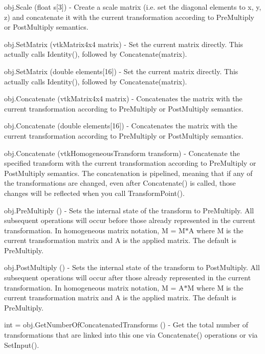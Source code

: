 \begin{DoxyItemize}
\item {\ttfamily obj.\-Scale (float s\mbox{[}3\mbox{]})} -\/ Create a scale matrix (i.\-e. set the diagonal elements to x, y, z) and concatenate it with the current transformation according to Pre\-Multiply or Post\-Multiply semantics.  
\item {\ttfamily obj.\-Set\-Matrix (vtk\-Matrix4x4 matrix)} -\/ Set the current matrix directly. This actually calls Identity(), followed by Concatenate(matrix).  
\item {\ttfamily obj.\-Set\-Matrix (double elements\mbox{[}16\mbox{]})} -\/ Set the current matrix directly. This actually calls Identity(), followed by Concatenate(matrix).  
\item {\ttfamily obj.\-Concatenate (vtk\-Matrix4x4 matrix)} -\/ Concatenates the matrix with the current transformation according to Pre\-Multiply or Post\-Multiply semantics.  
\item {\ttfamily obj.\-Concatenate (double elements\mbox{[}16\mbox{]})} -\/ Concatenates the matrix with the current transformation according to Pre\-Multiply or Post\-Multiply semantics.  
\item {\ttfamily obj.\-Concatenate (vtk\-Homogeneous\-Transform transform)} -\/ Concatenate the specified transform with the current transformation according to Pre\-Multiply or Post\-Multiply semantics. The concatenation is pipelined, meaning that if any of the transformations are changed, even after Concatenate() is called, those changes will be reflected when you call Transform\-Point().  
\item {\ttfamily obj.\-Pre\-Multiply ()} -\/ Sets the internal state of the transform to Pre\-Multiply. All subsequent operations will occur before those already represented in the current transformation. In homogeneous matrix notation, M = M$\ast$\-A where M is the current transformation matrix and A is the applied matrix. The default is Pre\-Multiply.  
\item {\ttfamily obj.\-Post\-Multiply ()} -\/ Sets the internal state of the transform to Post\-Multiply. All subsequent operations will occur after those already represented in the current transformation. In homogeneous matrix notation, M = A$\ast$\-M where M is the current transformation matrix and A is the applied matrix. The default is Pre\-Multiply.  
\item {\ttfamily int = obj.\-Get\-Number\-Of\-Concatenated\-Transforms ()} -\/ Get the total number of transformations that are linked into this one via Concatenate() operations or via Set\-Input().  

\end{DoxyItemize}
